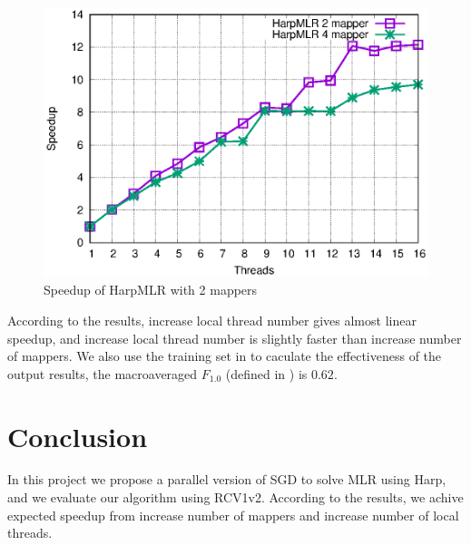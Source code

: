 \documentclass{sig-alternate-05-2015}
\begin{document}
\begin{figure}
  \includegraphics[scale=0.7]{fig/speedup.eps}
  \caption{Speedup of HarpMLR with 2 mappers}
  \label{fig:speedup}
\end{figure}
According to the results, increase local thread number gives almost linear speedup,
and increase local thread number is slightly faster than increase number of mappers.
We also use the training set in \cite{Lewis:2004:RNB:1005332.1005345} to caculate the effectiveness of the output results,
the macroaveraged $F_{1.0}$ (defined in \cite{Lewis:1995:EOA:215206.215366}) is $0.62$.

\section{Conclusion}\label{sec:con}
In this project we propose a parallel version of SGD to solve MLR using Harp,
and we evaluate our algorithm using RCV1v2.
According to the results, we achive expected speedup from increase number of mappers and increase number of local threads.



\end{document}
